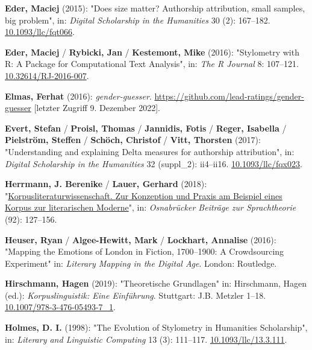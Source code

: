\documentclass[
  12pt,
  letterpaper,
  DIV=11,
  numbers=noendperiod]{scrreprt}
\newlength{\cslhangindent}
\newenvironment{CSLReferences}[2] %
 {\begin{list}{}{%
  \setlength{\itemindent}{0pt}
  \setlength{\leftmargin}{0pt}
  \setlength{\parsep}{0pt}
  \ifodd #1
   \setlength{\leftmargin}{\cslhangindent}
   \setlength{\itemindent}{-1\cslhangindent}
  \fi
  \setlength{\itemsep}{#2\baselineskip}}}
 {\end{list}}
\begin{document}
\begin{CSLReferences}{1}{0}
\textbf{Eder, Maciej} (2015): "Does size matter? {Authorship}
attribution, small samples, big problem", in: \emph{Digital Scholarship
in the Humanities} 30 (2): 167--182.
\href{https://doi.org/10.1093/llc/fqt066}{10.1093/llc/fqt066}.

\textbf{Eder, Maciej} / \textbf{Rybicki, Jan} / \textbf{Kestemont, Mike}
(2016): "Stylometry with {R}: {A} {Package} for {Computational} {Text}
{Analysis}", in: \emph{The R Journal} 8: 107--121.
\href{https://doi.org/10.32614/RJ-2016-007}{10.32614/RJ-2016-007}.

\textbf{Elmas, Ferhat} (2016): \emph{gender-guesser}.
\url{https://github.com/lead-ratings/gender-guesser} {[}letzter Zugriff
9. Dezember 2022{]}.

\textbf{Evert, Stefan} / \textbf{Proisl, Thomas} / \textbf{Jannidis,
Fotis} / \textbf{Reger, Isabella} / \textbf{Pielström, Steffen} /
\textbf{Schöch, Christof} / \textbf{Vitt, Thorsten} (2017):
"Understanding and explaining {Delta} measures for authorship
attribution", in: \emph{Digital Scholarship in the Humanities} 32
(suppl\_2): ii4--ii16.
\href{https://doi.org/10.1093/llc/fqx023}{10.1093/llc/fqx023}.

\textbf{Herrmann, J. Berenike} / \textbf{Lauer, Gerhard} (2018):
"\href{https://pub.uni-bielefeld.de/record/2955632}{Korpusliteraturwissenschaft.
{Zur} {Konzeption} und {Praxis} am {Beispiel} eines {Korpus} zur
literarischen {Moderne}}", in: \emph{Osnabrücker Beiträge zur
Sprachtheorie} (92): 127--156.

\textbf{Heuser, Ryan} / \textbf{Algee-Hewitt, Mark} / \textbf{Lockhart,
Annalise} (2016): "Mapping the {Emotions} of {London} in {Fiction},
1700--1900: {A} {Crowdsourcing} {Experiment}" in: \emph{Literary
{Mapping} in the {Digital} {Age}}. London: Routledge.

\textbf{Hirschmann, Hagen} (2019): "Theoretische {Grundlagen}" in:
Hirschmann, Hagen (ed.): \emph{Korpuslinguistik: {Eine} {Einführung}}.
Stuttgart: J.B. Metzler 1--18.
\href{https://doi.org/10.1007/978-3-476-05493-7_1}{10.1007/978-3-476-05493-7\_1}.

\textbf{Holmes, D. I.} (1998): "The {Evolution} of {Stylometry} in
{Humanities} {Scholarship}", in: \emph{Literary and Linguistic
Computing} 13 (3): 111--117.
\href{https://doi.org/10.1093/llc/13.3.111}{10.1093/llc/13.3.111}.


\end{CSLReferences}
\end{document}
